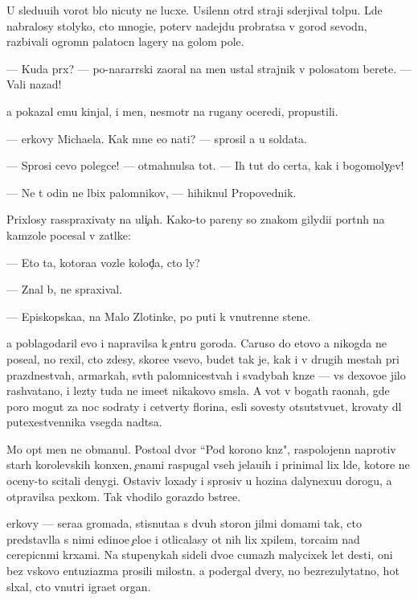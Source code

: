 \documentclass[10pt]{book}
\begin{document}
U sledu{\y}u{\x}ih vorot b{\yi}lo nicuty ne lucxe. Usilenn{\yi}{\y} otr{\ia}d straji sderjival tolpu. L{\io}de{\y} nabralosy stolyko, cto mnogi{\y}e, poter{\ia}v nadejdu probratsa v gorod sevodn{\ia}, razbivali ogromn{\yi}{\y} palatocn{\yi}{\y} lagery na golom pole.

— Kuda pr{\e}x? — po-nararrski zaoral na men{\ia} ustal{\yi}{\y} strajnik v polosatom berete. — Vali nazad!

{\Y}a pokazal {\y}emu kinjal, i men{\ia}, ne\-smo\-tr{\ia} na rugany oceredi, propustili.

— {\C}erkovy Michaela. Kak mne {\y}e{\y}o na{\y}ti? — sprosil {\y}a u soldata.

— Sprosi cevo polegce! — otmahnulsa tot. — Ih tut do certa, kak i bogomoly{\c}ev!

— Ne t{\yi} odin ne l{\io}bix palomnikov, — hihiknul Pro\-po\-ved\-nik.

Prixlosy rasspraxivaty na uli{\c}ah. Kako{\y}-to pareny so znakom gilydi{\y}i portn{\yi}h na kamzole pocesal v za\-t{\yi}l\-ke:

— Eto ta, kotora{\y}a voz\-le kolod{\c}a, cto ly?

— Znal b{\yi}, ne spraxival.

— Episkopska{\y}a, na Malo{\y} Zlotinke, po puti k vnutrenne{\y} stene.

{\Y}a poblagodaril {\y}evo i napravilsa k {\c}entru go\-ro\-da. Caruso do etovo {\y}a nikogda ne pose{\x}al, no rexil, cto zdesy, skore{\y}e vsevo, budet tak je, kak i v drugih mestah pri prazdnestvah, {\y}armarkah, sv{\ia}t{\yi}h palomnicestvah i svadybah kn{\ia}ze{\y} — vs{\e} de\-xo\-vo\-{\y}e jil{\y}o rashvatano, i lezty tuda ne ime{\y}et nikakovo sm{\yi}sla. A vot v bogat{\yi}h ra{\y}onah, gde poro{\y} mogut za noc sodraty i cetverty florina, {\y}esli sovesty otsutstvu{\y}et, krovaty dl{\ia} putexestvennika vsegda na{\y}d{\e}tsa.

Mo{\y} op{\yi}t men{\ia} ne obmanul. Posto{\y}al{\yi}{\y} dvor ``Pod korono{\y} kn{\ia}z{\ia}", raspolojen\-n{\yi}{\y} naprotiv star{\yi}h korolevskih kon{\io}xen, {\c}enami raspugal vseh jela{\y}u{\x}ih i pri\-ni\-mal lix l{\io}de{\y}, ko\-to\-r{\yi}\-{\y}e ne oceny-to scitali denygi. Ostaviv loxady i sprosiv u ho\-z{\ia}\-{\y}i\-na dalyne{\y}xu{\y}u do\-ro\-gu, {\y}a otpravilsa pexkom. Tak v{\yi}hodilo gorazdo b{\yi}stre{\y}e.

{\C}erkovy — sera{\y}a gromada, stisnuta{\y}a s dvuh storon jil{\yi}mi domami tak, cto predstavl{\ia}la s nimi {\y}edino{\y}e {\c}elo{\y}e i otlicalasy ot nih lix xpilem, torca{\x}im nad cerepic\-n{\yi}\-mi kr{\yi}xami. Na stupenykah sideli dvo{\y}e cumaz{\yi}h malycixek let des{\ia}ti, oni bez vs{\ia}kovo entuziazma prosili milost{\yi}n{\io}. {\Y}a podergal dvery, no bezrezulytatno, hot{\ia} sl{\yi}xal, cto vnutri igra{\y}et organ.
\end{document}
